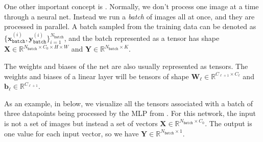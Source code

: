 One other important concept is . Normally, we don't process one image at a time through a neural net. Instead we run a \textit{batch} of images all at once, and they are processed in parallel. A batch sampled from the training data can be denoted as $\{\mathbf{x}_{\texttt{batch}}^{(i)}, \mathbf{y}_{\texttt{batch}}^{(i)}\}_{i=1}^{N_{\texttt{batch}}}$, and the batch represented as a tensor has shape $\mathbf{X} \in \mathbb{R}^{N_{\texttt{batch}} \times C_0 \times H \times W}$ and $\mathbf{Y} \in \mathbb{R}^{N_{\texttt{batch}} \times K}$.

The weights and biases of the net are also usually represented as tensors. The weights and biases of a linear layer will be tensors of shape $\mathbf{W}_{\ell} \in \mathbb{R}^{C_{\ell+1} \times C_{\ell}}$ and $\mathbf{b}_{\ell} \in \mathbb{R}^{C_{\ell+1}}$.

As an example, in \fig{\ref{fig:neural_nets:simple_MLP_network_tensors_and_batches}} below, we visualize all the tensors associated with a batch of three datapoints being processed by the MLP from \fig{\ref{fig:neural_nets:simple_MLP_network}}. For this network, the input is not a set of images but instead a set of vectors $\mathbf{X} \in \mathbb{R}^{N_{\texttt{batch}} \times C_0}$. The output is one value for each input vector, so we have $\mathbf{Y} \in \mathbb{R}^{N_{\texttt{batch}} \times 1}$.

